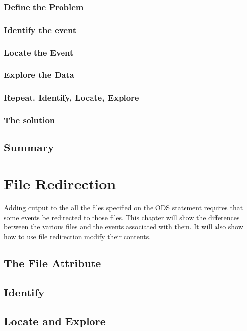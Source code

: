 \documentclass{book}
\begin{document}
\subsection{Define the Problem}

\subsection{Identify the event}

\subsection{Locate the Event}

\subsection{Explore the Data}

\subsection{Repeat.  Identify, Locate, Explore} 

\subsection{The solution}

\section{Summary}

\chapter{File Redirection}
Adding output to the all the files specified on the ODS 
statement requires that some events be redirected to those
files.  This chapter will show the differences between the
various files and the events associated with them.  It will
also show how to use file redirection modify their contents.
\section{The File Attribute}

\section{Identify}

\section{Locate and Explore}
\end{document}
